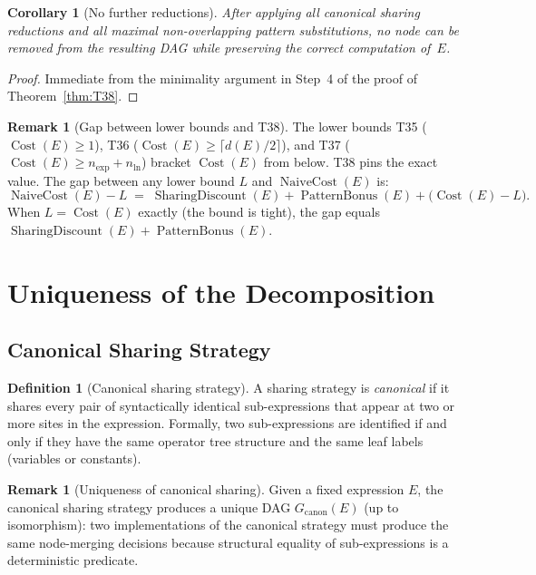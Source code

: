 \documentclass[12pt,a4paper]{article}
\newtheorem{corollary}[theorem]{Corollary}
\theoremstyle{definition}
\newtheorem{definition}[theorem]{Definition}
\newtheorem{remark}[theorem]{Remark}
\newcommand{\Cost}{\operatorname{Cost}}
\newcommand{\NC}{\operatorname{NaiveCost}}
\newcommand{\SD}{\operatorname{SharingDiscount}}
\newcommand{\PB}{\operatorname{PatternBonus}}
\begin{document}
\begin{corollary}[No further reductions]
\label{cor:exhaustion}
After applying all canonical sharing reductions and all maximal non-overlapping
pattern substitutions, no node can be removed from the resulting DAG while
preserving the correct computation of~$E$.
\end{corollary}

\begin{proof}
Immediate from the minimality argument in Step~4 of the proof of
Theorem~\ref{thm:T38}.
\end{proof}

\begin{remark}[Gap between lower bounds and T38]
The lower bounds T35 ($\Cost(E) \geq 1$), T36 ($\Cost(E) \geq \lceil
d(E)/2\rceil$), and T37 ($\Cost(E) \geq n_{\exp} + n_{\ln}$) bracket
$\Cost(E)$ from below.  T38 pins the exact value.  The gap between any lower
bound $L$ and $\NC(E)$ is:
\[
  \NC(E) - L \;=\; \SD(E) + \PB(E) + \bigl(\Cost(E) - L\bigr).
\]
When $L = \Cost(E)$ exactly (the bound is tight), the gap equals
$\SD(E) + \PB(E)$.
\end{remark}

\section{Uniqueness of the Decomposition}
\label{sec:unique}

\subsection{Canonical Sharing Strategy}

\begin{definition}[Canonical sharing strategy]
\label{def:canonical-sharing}
A sharing strategy is \emph{canonical} if it shares every pair of
syntactically identical sub-expressions that appear at two or more sites in the
expression.  Formally, two sub-expressions are identified if and only if they
have the same operator tree structure and the same leaf labels (variables or
constants).
\end{definition}

\begin{remark}[Uniqueness of canonical sharing]
Given a fixed expression $E$, the canonical sharing strategy produces a unique
DAG $G_{\mathrm{canon}}(E)$ (up to isomorphism): two implementations of the
canonical strategy must produce the same node-merging decisions because
structural equality of sub-expressions is a deterministic predicate.
\end{remark}
\end{document}

